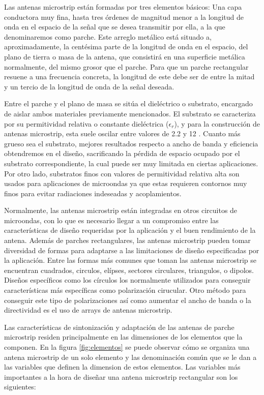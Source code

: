 \par Las antenas microstrip están formadas por tres elementos básicos: Una capa conductora muy fina, hasta tres órdenes de magnitud menor a la longitud de onda en el espacio de la señal que se desea transmitir por ella, a la que denominaremos como parche. Este arreglo metálico está situado a, aproximadamente, la centésima parte de la longitud de onda en el espacio, del plano de tierra o masa de la antena, que consistirá en una superficie metálica normalmente, del mismo grosor que el parche. Para que un parche rectangular resuene a una frecuencia concreta, la longitud de este debe ser de entre la mitad y un tercio de la longitud de onda de la señal deseada.
\\
\par Entre el parche y el plano de masa se sitúa el dieléctrico o substrato, encargado de aislar ambos materiales previamente mencionados. El substrato se caracteriza por su permitividad relativa o constante dieléctrica ($\epsilon_{r}$), y para la construcción de antenas microstrip, esta suele oscilar entre valores de 2.2 y 12 . Cuanto más grueso sea el substrato, mejores resultados respecto a ancho de banda y eficiencia obtendremos en el diseño, sacrificando la pérdida de espacio ocupado por el substrato correspondiente, la cual puede ser muy limitada en ciertas aplicaciones. Por otro lado, substratos finos con valores de permitividad relativa alta son usados para aplicaciones de microondas ya que estas requieren contornos muy finos para evitar radiaciones indeseadas y acoplamientos.
\\
\par Normalmente, las antenas microstrip están integradas en otros circuitos de microondas, con lo que es necesario llegar a un compromiso entre las características de diseño requeridas por la aplicación y el buen rendimiento de la antena. Además de parches rectangulares, las antenas microstrip pueden tomar diversidad de formas para adaptarse a las limitaciones de diseño especificadas por la aplicación. Entre las formas más comunes que toman las antenas microstrip se encuentran cuadrados, circulos, elípses, sectores circulares, triangulos, o dipolos. Diseños específicos como los círculos los normalmente utilizados para conseguir características más específicas como polarización cirucular. Otro método para conseguir este tipo de polarizaciones así como aumentar el ancho de banda o la directividad es el uso de arrays de antenas microstrip. 
\\
\par Las características de sintonización y adaptación de las antenas de parche microstrip residen principalmente en las dimensiones de los elementos que la componen. En la figura \ref{fig:elementos} se puede observar cómo se organiza una antena microstrip de un solo elemento y las denominación común que se le dan a las variables que definen la dimension de estos elementos. Las variables más importantes a la hora de diseñar una antena microstrip rectangular son los siguientes:

